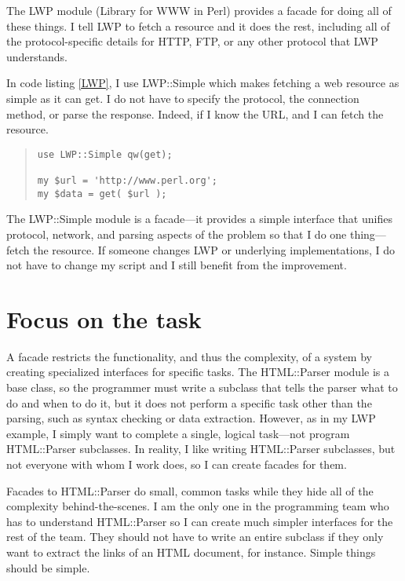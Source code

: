 The LWP module (Library for WWW in Perl) provides a facade for doing
all of these things.  I tell LWP to fetch a resource and it does the
rest, including all of the protocol-specific details for HTTP, FTP, or
any other protocol that LWP understands.

In code listing \ref{LWP}, I use LWP::Simple which makes fetching a
web resource as simple as it can get.  I do not have to specify the
protocol, the connection method, or parse the response.  Indeed, if I
know the URL, and I can fetch the resource.

\begin{quote}
\begin{verbatim}
use LWP::Simple qw(get);
	
my $url = 'http://www.perl.org';
my $data = get( $url );
\end{verbatim}
\end{quote}

The LWP::Simple module is a facade---it provides a simple interface
that unifies protocol, network, and parsing aspects of the problem so
that I do one thing---fetch the resource.  If someone changes 
LWP or underlying implementations, I do not have to change my
script and I still benefit from the improvement.


\section{Focus on the task}

A facade restricts the functionality, and thus the complexity, of a
system by creating specialized interfaces for specific tasks. The
HTML::Parser module is a base class, so the programmer must write a
subclass that tells the parser what to do and when to do it, but it
does not perform a specific task other than the parsing, such as
syntax checking or data extraction.  However, as in my LWP
example, I simply want to complete a single, logical task---not program
HTML::Parser subclasses.  In reality, I like writing HTML::Parser
subclasses, but not everyone with whom I work does, so I can create
facades for them.

Facades to HTML::Parser do small, common tasks while they hide all of
the complexity behind-the-scenes.  I am the only one in the
programming team who has to understand HTML::Parser so I can create
much simpler interfaces for the rest of the team. They should not have
to write an entire subclass if they only want to extract the links of
an HTML document, for instance.  Simple things should be simple.

